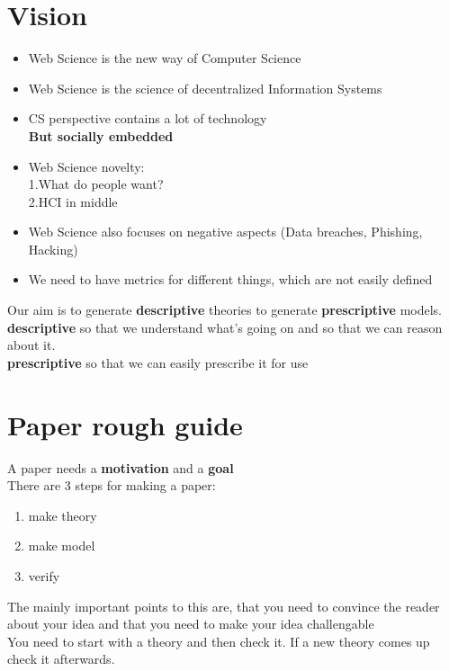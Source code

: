 \documentclass[a4paper]{article}
\begin{document}
\section{Vision}
	\begin{itemize}
	\setlength{\itemsep}{-3pt}
	\item Web Science is the new way of Computer Science
	\item Web Science is the science of decentralized Information Systems
	\item CS perspective contains a lot of technology \\ {\bf But socially embedded}
	\item Web Science novelty: \\1.What do people want?\\2.HCI in middle
	\item Web Science also focuses on negative aspects (Data breaches, Phishing, Hacking)
	\item We need to have metrics for different things, which are not easily defined
	\end{itemize}
	Our aim is to generate {\bf descriptive} theories to generate {\bf prescriptive} models.\\
	{\bf descriptive} so that we understand what's going on and so that we can reason about it.\\
	{\bf prescriptive} so that we can easily prescribe it for use

\section{Paper rough guide}
	A paper needs a {\bf motivation} and a {\bf goal}\\
	There are 3 steps for making a paper:\\
	\begin{enumerate}
	\setlength{\itemsep}{-3pt}
	\item make theory
	\item make model
	\item verify
	\end{enumerate}
	The mainly important points to this are, that you need to convince the reader about your idea and
	that you need to make your idea challengable\\
	You need to start with a theory and then check it. If a new theory comes up check it afterwards.
	
\end{document}
